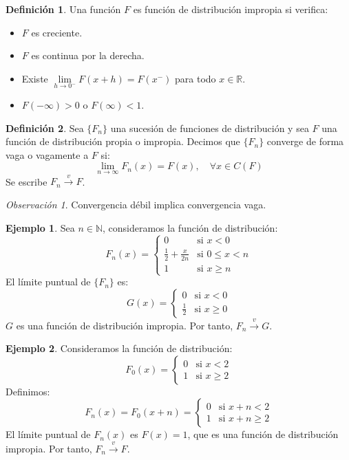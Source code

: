 \documentclass{report}
\theoremstyle{remark}
\newtheorem*{remark}{Observación}
\theoremstyle{remark}
\theoremstyle{remark}
\theoremstyle{definition}
\newtheorem{definition}{Definición}[chapter]
\theoremstyle{definition}
\theoremstyle{definition}
\newtheorem*{example}{Ejemplo}
\theoremstyle{definition}
\begin{document}
\begin{definition}
    Una función $F$ es función de distribución impropia si verifica:
    \begin{itemize}
        \item $F$ es creciente.
        \item $F$ es continua por la derecha.
        \item Existe $\lim\limits_{h \to 0^-} F(x+h) = F(x^-)$ para todo $x \in \mathbb{R}$.
        \item $F(-\infty) > 0$ o $F(\infty) < 1$.
    \end{itemize}
\end{definition}

\begin{definition}
    Sea $\{F_n\}$ una sucesión de funciones de distribución y sea $F$ una función de distribución propia o impropia.
    Decimos que $\{F_n\}$ converge de forma vaga o vagamente a $F$ si:
    $$\lim\limits_{n \to \infty} F_n(x) = F(x), \quad \forall x \in C(F)$$
    Se escribe $F_n \xrightarrow{v} F$.
\end{definition}

\begin{remark}
    Convergencia débil implica convergencia vaga.
\end{remark}

\begin{example}
    Sea $n \in \mathbb{N}$, consideramos la función de distribución:
    $$F_n(x) = \begin{cases}
            0                          & \text{si } x < 0        \\
            \frac{1}{2} + \frac{x}{2n} & \text{si } 0 \leq x < n \\
            1                          & \text{si } x \geq n
        \end{cases}$$
    El límite puntual de $\{F_n\}$ es:
    $$G(x) = \begin{cases}
            0           & \text{si } x < 0    \\
            \frac{1}{2} & \text{si } x \geq 0
        \end{cases}$$
    $G$ es una función de distribución impropia.
    Por tanto, $F_n \xrightarrow{v} G$.
\end{example}

\begin{example}
    Consideramos la función de distribución:
    $$F_0(x) = \begin{cases}
            0 & \text{si } x < 2    \\
            1 & \text{si } x \geq 2
        \end{cases}$$
    Definimos:
    $$F_n(x) = F_0(x+n) = \begin{cases}
            0 & \text{si } x+n < 2    \\
            1 & \text{si } x+n \geq 2
        \end{cases}$$
    El límite puntual de $F_n(x)$ es $F(x) = 1$, que es una función de distribución impropia.
    Por tanto, $F_n \xrightarrow{v} F$.
\end{example}
\end{document}
